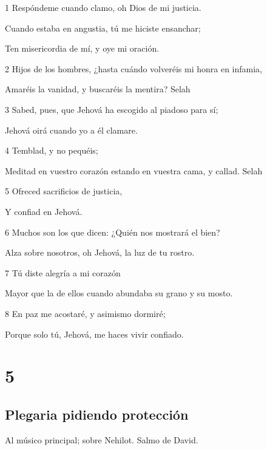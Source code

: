 \par 1 Respóndeme cuando clamo, oh Dios de mi justicia.
\par Cuando estaba en angustia, tú me hiciste ensanchar;
\par Ten misericordia de mí, y oye mi oración.
\par 2 Hijos de los hombres, ¿hasta cuándo volveréis mi honra en infamia,
\par Amaréis la vanidad, y buscaréis la mentira? Selah
\par 3 Sabed, pues, que Jehová ha escogido al piadoso para sí;
\par Jehová oirá cuando yo a él clamare.
\par 4 Temblad, y no pequéis;
\par Meditad en vuestro corazón estando en vuestra cama, y callad. Selah
\par 5 Ofreced sacrificios de justicia,
\par Y confiad en Jehová.
\par 6 Muchos son los que dicen: ¿Quién nos mostrará el bien?
\par Alza sobre nosotros, oh Jehová, la luz de tu rostro.
\par 7 Tú diste alegría a mi corazón
\par Mayor que la de ellos cuando abundaba su grano y su mosto.
\par 8 En paz me acostaré, y asimismo dormiré;
\par Porque solo tú, Jehová, me haces vivir confiado.

\chapter{5}

\section*{Plegaria pidiendo protección}

\par Al músico principal; sobre Nehilot. Salmo de David.

